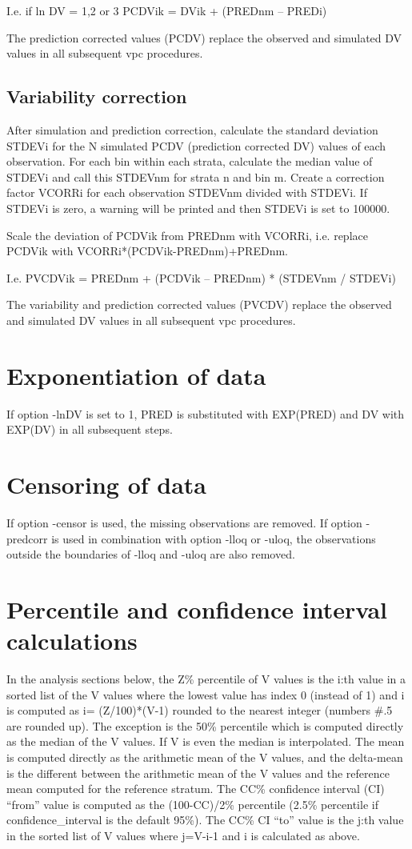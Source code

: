 I.e. if ln DV = 1,2 or 3	PCDVik = DVik + (PREDnm – PREDi)

The prediction corrected values (PCDV) replace the observed and simulated DV values in all subsequent vpc procedures.

\subsection{Variability correction}
After simulation and prediction correction, calculate the standard deviation STDEVi for  the N simulated PCDV (prediction corrected DV) values of each observation. For each bin within each strata, calculate the median value of STDEVi and call this STDEVnm for strata n and bin m. Create a correction factor VCORRi for each observation STDEVnm divided with STDEVi. If STDEVi is zero, a warning will be printed and then STDEVi is set to 100000.

Scale the deviation of PCDVik from PREDnm with VCORRi, i.e. replace PCDVik with VCORRi*(PCDVik-PREDnm)+PREDnm. 

I.e. 	PVCDVik = PREDnm + (PCDVik – PREDnm) * (STDEVnm / STDEVi)

The variability and prediction corrected values (PVCDV) replace the observed and simulated DV values in all subsequent vpc procedures.

\section{Exponentiation of data}
If option -lnDV is set to 1,  PRED is substituted with EXP(PRED) and DV with EXP(DV) in all subsequent steps. 

\section{Censoring of data}
If option -censor is used, the missing observations are removed. If option -predcorr is used in combination with option -lloq or -uloq, the observations outside the boundaries of -lloq and -uloq are also removed.

\section{Percentile and confidence interval calculations}
In the analysis sections below, the Z\% percentile of V values is the i:th value in a sorted list of the V values where the lowest value has index 0 (instead of 1) and i is computed as i= (Z/100)*(V-1) rounded to the nearest integer (numbers \#.5 are rounded up). The exception is the 50\% percentile which is computed directly as the median of the V values. If V is even the median is interpolated. The mean is computed directly as the arithmetic mean of the V values, and the delta-mean is the different between the arithmetic mean of the V values and the reference mean computed for the reference stratum.  The CC\% confidence interval (CI) “from” value is computed as the (100-CC)/2\% percentile (2.5\% percentile if confidence\_interval is the default 95\%). The CC\% CI “to” value is the j:th value in the sorted list of V values where j=V-i-1 and i is calculated as above.
\newpage

